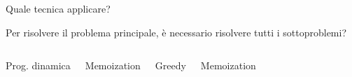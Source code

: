 \begin{frame}{Quale tecnica applicare?}

\vspace{-9pt}
\begin{myboxtitle}
\BIL
\item Per risolvere il problema principale, è necessario risolvere tutti i sottoproblemi?
\EIL
\end{myboxtitle}

\vspace{-9pt}
\begin{columns}[T]
\BIL
\item Prog. dinamica
\item Memoization
\EIL
{}
\BIL
\item Greedy
\item Memoization
\EIL
\end{columns}

\end{frame}






